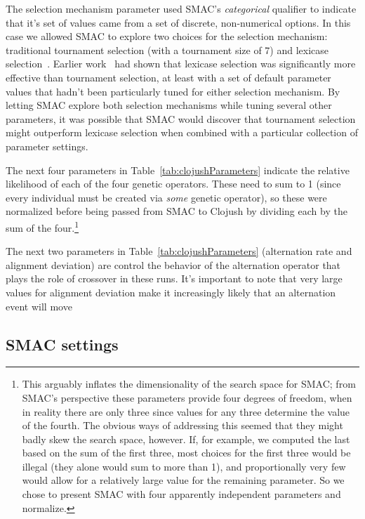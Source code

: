 The selection mechanism parameter used SMAC's \emph{categorical} qualifier to
indicate that it's set of values came from a set of discrete, non-numerical
options. In this case we allowed SMAC to explore two choices for the selection
mechanism: traditional tournament selection (with a tournament size of 7) and
lexicase selection~\cite{lexicase:things}. Earlier 
work~\cite{Helmuth:2015:GECCO} had shown that lexicase selection was
significantly more effective than tournament selection, at least with a set of 
default parameter values that hadn't been particularly tuned for either
selection mechanism. By letting SMAC explore both selection mechanisms while
tuning several other parameters, it was possible that SMAC would discover
that tournament selection might outperform lexicase selection when combined
with a particular collection of parameter settings.

The next four parameters in Table~\ref{tab:clojushParameters} indicate the
relative likelihood of each of the four genetic operators. These need to sum
to 1 (since every individual must be created via \emph{some} genetic operator),
so these were normalized before being passed from SMAC to Clojush by dividing
each by the sum of the four.\footnote{This arguably inflates the dimensionality of the
search space for SMAC; from SMAC's perspective these parameters provide four
degrees of freedom, when in reality there are only three since values for any
three determine the value of the fourth. The obvious ways of addressing this
seemed that they might badly skew the search space, however. If, for example,
we computed the last based on the sum of the first three, most choices for the
first three would be illegal (they alone would sum to more than 1), and
proportionally very few would allow for a relatively large value for the
remaining parameter. So we chose to present SMAC with four apparently 
independent parameters and normalize.}

The next two parameters in Table~\ref{tab:clojushParameters} (alternation
rate and alignment deviation) are control the behavior of the alternation
operator that plays the role of crossover in these runs. It's important to
note that very large values for alignment deviation make it increasingly
likely that an alternation event will move 

\subsection{SMAC settings}
\label{sec:SMACsettings}

